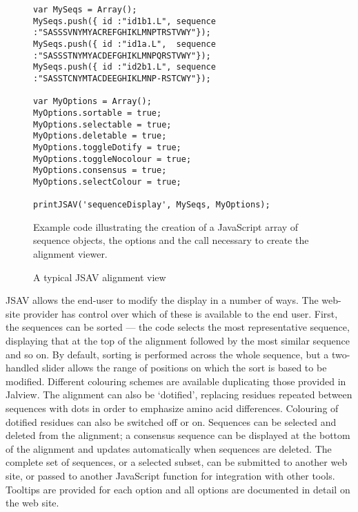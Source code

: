 \documentclass[12pt]{article}
\begin{document}
\begin{figure}
\footnotesize
\begin{verbatim}
var MySeqs = Array();
MySeqs.push({ id :"id1b1.L", sequence :"SASSSVNYMYACREFGHIKLMNPTRSTVWY"});
MySeqs.push({ id :"id1a.L",  sequence :"SASSSTNYMYACDEFGHIKLMNPQRSTVWY"});
MySeqs.push({ id :"id2b1.L", sequence :"SASSTCNYMTACDEEGHIKLMNP-RSTCWY"});

var MyOptions = Array();
MyOptions.sortable = true;
MyOptions.selectable = true;
MyOptions.deletable = true;
MyOptions.toggleDotify = true;
MyOptions.toggleNocolour = true;
MyOptions.consensus = true;
MyOptions.selectColour = true;

printJSAV('sequenceDisplay', MySeqs, MyOptions);
\end{verbatim}
\caption{\label{fig:code}Example code illustrating the creation of a
JavaScript array of sequence objects, the options and the call
necessary to create the alignment viewer.}
\end{figure}

\begin{figure}
\caption{\label{fig:demo}A typical JSAV alignment view}
\end{figure}

JSAV allows the end-user to modify the display in a number of ways.
The web-site provider has control over which of these is available to
the end user. First, the sequences can be sorted --- the code selects
the most representative sequence, displaying that at the top of the
alignment followed by the most similar sequence and so on. By default,
sorting is performed across the whole sequence, but a two-handled
slider allows the range of positions on which the sort is based to be
modified. Different colouring schemes are available duplicating those
provided in Jalview. The alignment can also be `dotified', replacing
residues repeated between sequences with dots in order to emphasize
amino acid differences. Colouring of dotified residues can also be
switched off or on. Sequences can be selected and deleted from the
alignment; a consensus sequence can be displayed at the bottom of the
alignment and updates automatically when sequences are deleted. The
complete set of sequences, or a selected subset, can be submitted to
another web site, or passed to another JavaScript function for
integration with other tools. Tooltips are provided for each option
and all options are documented in detail on the web site.
\end{document}
